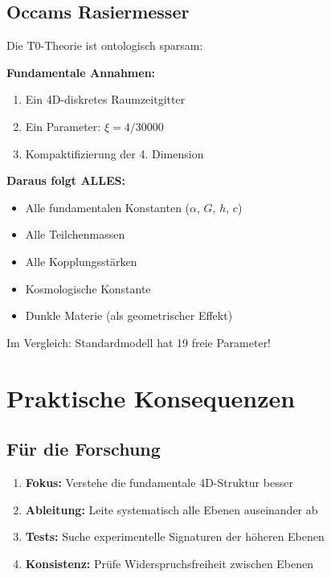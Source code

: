 	\subsection{Occams Rasiermesser}
	
	\begin{keyresult}
		Die T0-Theorie ist ontologisch sparsam:
		
		\vspace{0.3cm}
		
		\textbf{Fundamentale Annahmen:}
		\begin{enumerate}
			\item Ein 4D-diskretes Raumzeitgitter
			\item Ein Parameter: $\xi = 4/30000$
			\item Kompaktifizierung der 4. Dimension
		\end{enumerate}
		
		\vspace{0.3cm}
		
		\textbf{Daraus folgt ALLES:}
		\begin{itemize}
			\item Alle fundamentalen Konstanten ($\alpha$, $G$, $h$, $c$)
			\item Alle Teilchenmassen
			\item Alle Kopplungsstärken
			\item Kosmologische Konstante
			\item Dunkle Materie (als geometrischer Effekt)
		\end{itemize}
		
		\vspace{0.3cm}
		
		Im Vergleich: Standardmodell hat 19 freie Parameter!
	\end{keyresult}
	
	\section{Praktische Konsequenzen}
	
	\subsection{Für die Forschung}
	
	\begin{enumerate}
		\item \textbf{Fokus:} Verstehe die fundamentale 4D-Struktur besser
		\item \textbf{Ableitung:} Leite systematisch alle Ebenen auseinander ab
		\item \textbf{Tests:} Suche experimentelle Signaturen der höheren Ebenen
		\item \textbf{Konsistenz:} Prüfe Widerspruchsfreiheit zwischen Ebenen
	\end{enumerate}
	
